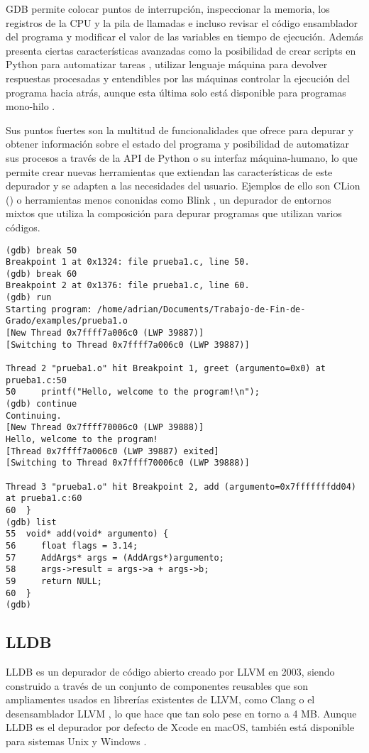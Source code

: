 GDB permite colocar puntos de interrupción, inspeccionar la memoria, los \gls{registros} de la \gls{CPU} y la pila de llamadas e incluso revisar el código \gls{ensamblador} del programa y modificar el valor de las variables en tiempo de ejecución. Además presenta ciertas características avanzadas como la posibilidad de crear \glspl{script} en Python para automatizar tareas \cite{GDBPython}, utilizar \gls{lenguaje máquina} para devolver respuestas procesadas y entendibles por las máquinas \cite{GDB/MI} controlar la ejecución del programa hacia atrás, aunque esta última solo está disponible para programas mono-hilo \cite{GDBReversing}.

Sus puntos fuertes son la multitud de funcionalidades que ofrece para \gls{depurar} y obtener información sobre el estado del programa y posibilidad de automatizar sus \glspl{proceso} a través de la \gls{API} de Python o su \gls{interfaz máquina-humano}, lo que permite crear nuevas herramientas que extiendan las características de este \gls{depurador} y se adapten a las necesidades del usuario. Ejemplos de ello son CLion () o herramientas menos cononidas como Blink \cite{Blink}, un \gls{depurador} de entornos mixtos que utiliza la composición para \gls{depurar} programas que utilizan varios códigos.

\begin{lstlisting}[caption={Muestra del depurador GDB}]
(gdb) break 50
Breakpoint 1 at 0x1324: file prueba1.c, line 50.
(gdb) break 60
Breakpoint 2 at 0x1376: file prueba1.c, line 60.
(gdb) run
Starting program: /home/adrian/Documents/Trabajo-de-Fin-de-Grado/examples/prueba1.o 
[New Thread 0x7ffff7a006c0 (LWP 39887)]
[Switching to Thread 0x7ffff7a006c0 (LWP 39887)]

Thread 2 "prueba1.o" hit Breakpoint 1, greet (argumento=0x0) at prueba1.c:50
50	   printf("Hello, welcome to the program!\n");
(gdb) continue
Continuing.
[New Thread 0x7ffff70006c0 (LWP 39888)]
Hello, welcome to the program!
[Thread 0x7ffff7a006c0 (LWP 39887) exited]
[Switching to Thread 0x7ffff70006c0 (LWP 39888)]

Thread 3 "prueba1.o" hit Breakpoint 2, add (argumento=0x7fffffffdd04) at prueba1.c:60
60	}
(gdb) list
55	void* add(void* argumento) {
56	   float flags = 3.14;
57	   AddArgs* args = (AddArgs*)argumento;
58	   args->result = args->a + args->b;
59	   return NULL;
60	}
(gdb) 
\end{lstlisting}

\subsection{LLDB}{\label{subsec:lldb}}
LLDB es un \gls{depurador} de \gls{código abierto} creado por LLVM en 2003, siendo construido a través de un conjunto de componentes reusables que son ampliamentes usados en librerías existentes de LLVM, como Clang o el \gls{desensamblador} LLVM \cite{LLDB}, lo que hace que tan solo pese en torno a 4 MB.
Aunque LLDB es el depurador por defecto de Xcode en macOS, también está disponible para sistemas Unix y Windows \cite{LLDB}.

